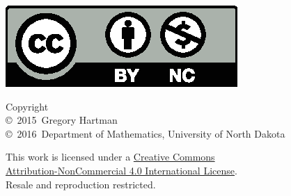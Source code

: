 
\noindent\hspace{-1in}\begin{minipage}{2in}
\href{http://creativecommons.org/licenses/by-nc/4.0/}{\includegraphics{text/by-nc}}
\end{minipage}%
\begin{minipage}{3in}
\noindent Copyright\\
\copyright~2015~Gregory Hartman\\
\copyright~2016~Department of Mathematics, University of North Dakota

This work is licensed under a \href{http://creativecommons.org/licenses/by-nc/4.0/}{Creative Commons\\Attribution-NonCommercial 4.0 International License}.\\
Resale and reproduction restricted.
\end{minipage}

